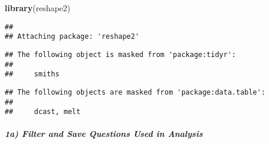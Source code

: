 \documentclass[
]{article}
\newenvironment{Shaded}{\begin{snugshade}}{\end{snugshade}}
\newcommand{\KeywordTok}[1]{\textcolor[rgb]{0.13,0.29,0.53}{\textbf{#1}}}
\newcommand{\NormalTok}[1]{#1}
\begin{document}
\begin{Shaded}
\begin{Highlighting}[]
\KeywordTok{library}\NormalTok{(reshape2)}
\end{Highlighting}
\end{Shaded}

\begin{verbatim}
## 
## Attaching package: 'reshape2'
\end{verbatim}

\begin{verbatim}
## The following object is masked from 'package:tidyr':
## 
##     smiths
\end{verbatim}

\begin{verbatim}
## The following objects are masked from 'package:data.table':
## 
##     dcast, melt
\end{verbatim}

\hypertarget{a-filter-and-save-questions-used-in-analysis}{%
\subparagraph{1a) Filter and Save Questions Used in
Analysis}\label{a-filter-and-save-questions-used-in-analysis}}
\end{document}
